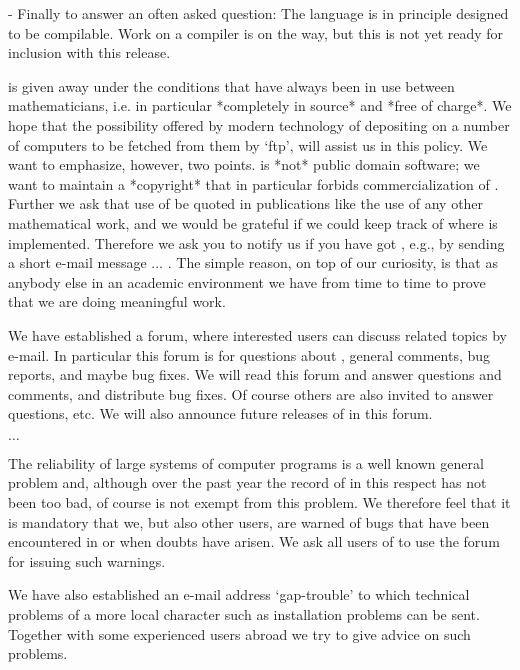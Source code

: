   \item{-}
    Finally to answer an often asked question: The  {\GAP} language is in
    principle  designed to be compilable.  Work  on a compiler  is on the
    way, but this is not yet ready for inclusion with this release.
\endlist

{\GAP} is given  away under the  conditions that have always  been in use
between  mathematicians, i.e.  in particular *completely  in source*  and
*free  of  charge*.  We  hope  that  the  possibility  offered  by modern
technology of  depositing {\GAP} on a number of  computers  to be fetched
from them by `ftp', will assist us in this policy.  We want to emphasize,
however, two points.  {\GAP} is  *not* public domain software; we want to
maintain  a *copyright* that  in particular forbids  commercialization of
{\GAP}.  Further we ask that use of {\GAP} be quoted in publications like
the use of any  other mathematical work, and  we would be grateful if  we
could keep track of where {\GAP} is implemented.  Therefore we ask you to
notify us if you have got {\GAP}, e.g., by sending a short e-mail message
$\ldots$ .
The simple reason,  on top of our
curiosity, is that  as anybody  else in  an academic  environment we have
from time to time to prove that we are doing meaningful work.

We  have established a {\GAP} forum, where interested  users  can discuss
{\GAP}  related  topics  by  e-mail.  In particular  this  forum  is  for
questions about  {\GAP}, general  comments, bug  reports,  and  maybe bug
fixes.   We will read this forum and answer questions  and  comments, and
distribute  bug  fixes.  Of course  others  are  also  invited to  answer
questions, etc.  We will  also announce future releases of {\GAP} in this
forum.

$\ldots$

The reliability of  large systems  of  computer programs is  a well known
general problem and, although over the past year the  record of {\GAP} in
this respect has not been too  bad, of  course  {\GAP} is not exempt from
this problem.  We therefore feel that it is mandatory  that  we, but also
other users, are warned of bugs that  have been encountered in  {\GAP} or
when doubts have arisen.  We  ask all users of {\GAP} to  use  the {\GAP}
forum for issuing such warnings.

We   have  also established  an e-mail    address  `gap-trouble' to which
technical  problems   of a  more local   character  such as  installation
problems can be sent. Together  with some experienced {\GAP} users abroad
we try to give advice on such problems.


